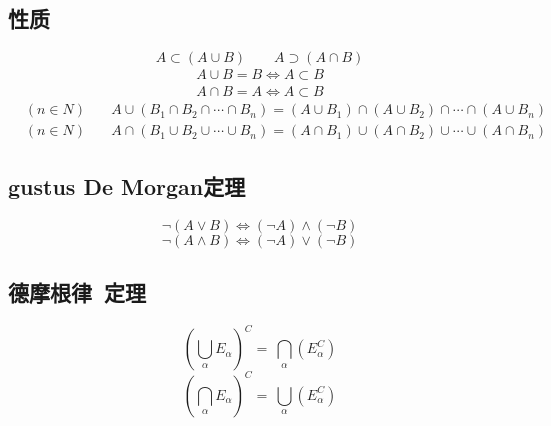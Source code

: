 \subsection{性质}
\begin{equation}
	A\subset(A\cup B) {\qquad}A\supset(A\cap B)
\end{equation}
\begin{align}
	A\cup B = B\Leftrightarrow A\subset B\\
	A\cap B = A\Leftrightarrow A\subset B
\end{align}
\begin{align}
&(n\in N)\quad&A\cup(B_1\cap B_2\cap\cdots\cap B_n) = (A\cup B_1)\cap(A\cup B_2)\cap\cdots\cap(A\cup B_n)\\
&(n\in N)&A\cap(B_1\cup B_2\cup\cdots\cup B_n) = (A\cap B_1)\cup(A\cap B_2)\cup\cdots\cup(A\cap B_n)
\end{align}
\subsection{gustus De Morgan定理}
$$\neg(A\vee B)\Leftrightarrow(\neg A)\land(\neg B)$$
$$\neg(A\land B)\Leftrightarrow(\neg A)\vee(\neg B)$$
\subsection{德摩根律\ 定理}
$$\left(\bigcup\limits_{\alpha}^{}E_\alpha\right)^C =\  \bigcap\limits_{\alpha}^{}(E_\alpha^C)$$
$$\left(\bigcap\limits_{\alpha}^{}E_\alpha\right)^C =\  \bigcup\limits_{\alpha}^{}(E_\alpha^C)$$
